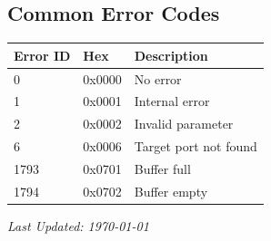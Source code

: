 \documentclass[11pt,a4paper]{article}
\begin{document}
\subsection*{Common Error Codes}

\begin{table}[h]
\centering
\begin{tabular}{@{}lll@{}}
\toprule
\textbf{Error ID} & \textbf{Hex} & \textbf{Description} \\
\midrule
0 & 0x0000 & No error \\
1 & 0x0001 & Internal error \\
2 & 0x0002 & Invalid parameter \\
6 & 0x0006 & Target port not found \\
1793 & 0x0701 & Buffer full \\
1794 & 0x0702 & Buffer empty \\
\bottomrule
\end{tabular}
\end{table}

\vfill

\begin{center}
\textit{Last Updated: \today}
\end{center}
\end{document}
